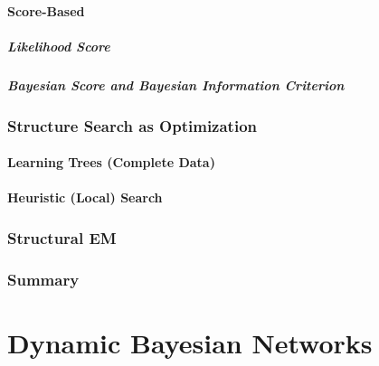 			\subsubsection{Score-Based} %

				\paragraph{Likelihood Score} %

				\paragraph{Bayesian Score and Bayesian Information Criterion} %

		\subsection{Structure Search as Optimization} %

			\subsubsection{Learning Trees (Complete Data)} %

			\subsubsection{Heuristic (Local) Search} %

		\subsection{Structural EM} %

		\subsection{Summary} %

\chapter{Dynamic Bayesian Networks} %

